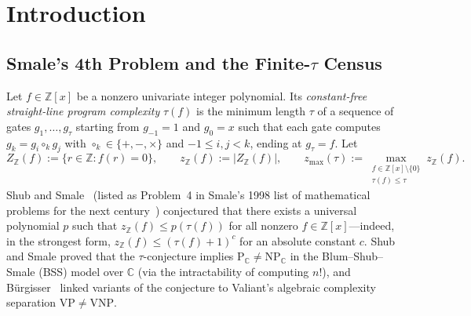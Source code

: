 \documentclass[11pt]{article}
\newcommand{\Z}{\mathbb{Z}}
\newcommand{\C}{\mathbb{C}}
\newcommand{\code}[1]{\texttt{#1}}
\newcommand{\zmax}{z_{\max}}
\newcommand{\zZ}{z_{\Z}}
\begin{document}
\begin{abstract}
\begin{enumerate}[label=(\arabic*),leftmargin=1.8em]
  \item \textbf{Machine-verified Lean~4.36.0 soundness proofs and adversarial audit:} Eight Lean~4 modules ($4{,}228$ lines, $204$ theorem/lemma declarations, zero \code{sorryAx}, strictly $\{\code{propext}, \code{Classical.choice}, \code{Quot.sound}\}$) formalize all canonicalization and dead-gate pruning reductions (\code{exists\_canonical}, \code{deadgate\_count\_bound}, \code{zmax9\_le\_six\_of\_checklist}, \code{zmax10\_le\_seven\_of\_checklist}), all per-leaf certificate rules (degree, atomic product mask, dual-number modular, Taylor-stripped, and CRT exact-zero), and all witnesses. An independent naive Rust enumerator ($\tau \le 7$, $0$ missing / $0$ extra polynomials) and a mutation/canary suite further audit the implementation; only the raw C enumeration loop and FLINT/Python execution remain outside the Lean kernel.
\end{enumerate}
This work does not resolve $\mathrm{P}$ vs $\mathrm{NP}$ or the asymptotic $\tau$-conjecture. It was developed with AI assistance (Antigravity Harness + Gemini 4 Neon) and audited via independent reimplementation, Lean~4 kernel checks, and transparent bug logging (\code{audit/BUGS.md}).
\end{abstract}

\section{Introduction}

\subsection{Smale's 4th Problem and the Finite-$\tau$ Census}
Let $f \in \Z[x]$ be a nonzero univariate integer polynomial. Its \emph{constant-free straight-line program complexity} $\tau(f)$ is the minimum length $\tau$ of a sequence of gates $g_1, \dots, g_\tau$ starting from $g_{-1} = 1$ and $g_0 = x$ such that each gate computes $g_k = g_i \circ_k g_j$ with $\circ_k \in \{+, -, \times\}$ and $-1 \le i, j < k$, ending at $g_\tau = f$. Let
\[
  Z_{\Z}(f) := \{r \in \Z : f(r) = 0\}, \qquad \zZ(f) := |Z_{\Z}(f)|, \qquad \zmax(\tau) := \max_{\substack{f \in \Z[x] \setminus \{0\} \\ \tau(f) \le \tau}} \zZ(f).
\]
Shub and Smale~\cite{ShubSmale1995} (listed as Problem~4 in Smale's 1998 list of mathematical problems for the next century~\cite{Smale1998}) conjectured that there exists a universal polynomial $p$ such that $\zZ(f) \le p(\tau(f))$ for all nonzero $f \in \Z[x]$---indeed, in the strongest form, $\zZ(f) \le (\tau(f) + 1)^c$ for an absolute constant $c$. Shub and Smale proved that the $\tau$-conjecture implies $\mathrm{P}_{\C} \neq \mathrm{NP}_{\C}$ in the Blum--Shub--Smale (BSS) model over $\C$ (via the intractability of computing $n!$), and B\"urgisser~\cite{Burgisser2009} linked variants of the conjecture to Valiant's algebraic complexity separation $\mathrm{VP} \neq \mathrm{VNP}$.
\end{document}

